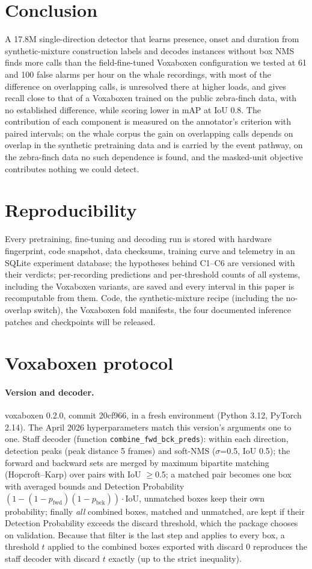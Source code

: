 \documentclass[10pt,twocolumn]{article}
\begin{document}
\section{Conclusion}
A 17.8M single-direction detector that learns presence, onset and duration from synthetic-mixture construction labels and decodes instances without box NMS finds more calls than the field-fine-tuned Voxaboxen configuration we tested at 61 and 100 false alarms per hour on the whale recordings, with most of the difference on overlapping calls, is unresolved there at higher loads, and gives recall close to that of a Voxaboxen trained on the public zebra-finch data, with no established difference, while scoring lower in mAP at IoU 0.8. The contribution of each component is measured on the annotator's criterion with paired intervals; on the whale corpus the gain on overlapping calls depends on overlap in the synthetic pretraining data and is carried by the event pathway, on the zebra-finch data no such dependence is found, and the masked-unit objective contributes nothing we could detect.

\section*{Reproducibility}
Every pretraining, fine-tuning and decoding run is stored with hardware fingerprint, code snapshot, data checksums, training curve and telemetry in an SQLite experiment database; the hypotheses behind C1--C6 are versioned with their verdicts; per-recording predictions and per-threshold counts of all systems, including the Voxaboxen variants, are saved and every interval in this paper is recomputable from them. Code, the synthetic-mixture recipe (including the no-overlap switch), the Voxaboxen fold manifests, the four documented inference patches and checkpoints will be released.

\appendix
\section{Voxaboxen protocol}
\label{app:vox}
\paragraph{Version and decoder.} voxaboxen 0.2.0, commit 20cf966, in a fresh environment (Python 3.12, PyTorch 2.14). The April 2026 hyperparameters match this version's arguments one to one. Staff decoder (function \texttt{combine\_fwd\_bck\_preds}): within each direction, detection peaks (peak distance 5 frames) and soft-NMS ($\sigma$=0.5, IoU 0.5); the forward and backward sets are merged by maximum bipartite matching (Hopcroft--Karp) over pairs with IoU $\ge$0.5; a matched pair becomes one box with averaged bounds and Detection Probability $(1-(1-p_{\mathrm{fwd}})(1-p_{\mathrm{bck}}))\cdot\mathrm{IoU}$, unmatched boxes keep their own probability; finally \emph{all} combined boxes, matched and unmatched, are kept if their Detection Probability exceeds the discard threshold, which the package chooses on validation. Because that filter is the last step and applies to every box, a threshold $t$ applied to the combined boxes exported with discard 0 reproduces the staff decoder with discard $t$ exactly (up to the strict inequality).
\end{document}
